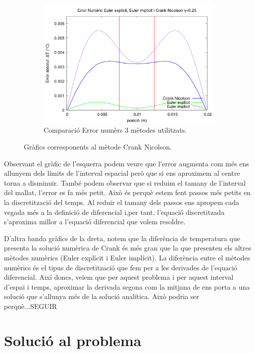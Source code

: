 \documentclass[11pt]{article}
\begin{document}
\begin{figure}[hbt!]
\begin{subfigure}{0.3\textwidth}
        \centering
        \includegraphics[width=\textwidth]{errtemp3met.png}
        \caption{Comparació Error numèrs 3 mètodes utilitzats.}
    \end{subfigure}
    \hspace{0.025\textwidth}
    \caption{Gràfics corresponents al mètode Crank Nicolson.}
    \label{fig:dues_imatges}
\end{figure}

Observant el gràfic de l'esquerra podem veure que l'error augmenta com més ens allunyem dels límits de l'interval espacial però que si ens aproximem al centre torna a disminuir. 
També podem observar que si reduim el tamany de l'interval del mallat, l'error es fa més petit. 
Això és perquè estem fent passos més petits en la discretització del temps. 
Al reduir el tamany dels passos ens apropem cada vegada més a la definició de diferencial i,per tant, l'equació discretitzada s'aproxima millor a l'equació diferencial que volem resoldre.

D'altra banda gràfics de la dreta, notem que la diferència de temperatura que presenta la solució numèrica de Crank és més gran que la que presenten els altres mètodes numèrics (Euler explícit i Euler implícit). 
La diferència entre el mètodes numèrics és el tipus de discretització que fem per a les derivades de l'equació diferencial. Així doncs, veiem que per aquest problema i per aquest interval d'espai i temps, aproximar la derivada segona com la mitjana de ens porta a una solució que s'allunya més de la solució analítica. 
Això podria ser perquè...SEGUIR

\section{Solució al problema}
\end{document}
